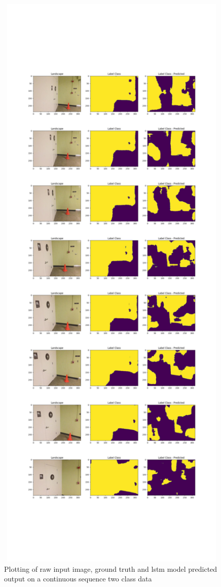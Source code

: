 	\begin{figure}
		\centering
		\includegraphics[width=16cm]{images/output_lstm.png}
		\caption{Plotting of raw input image, ground truth and lstm model predicted output on a continuous sequence two class data}
		\label{fig:output_lstm}
	\end{figure}
	
